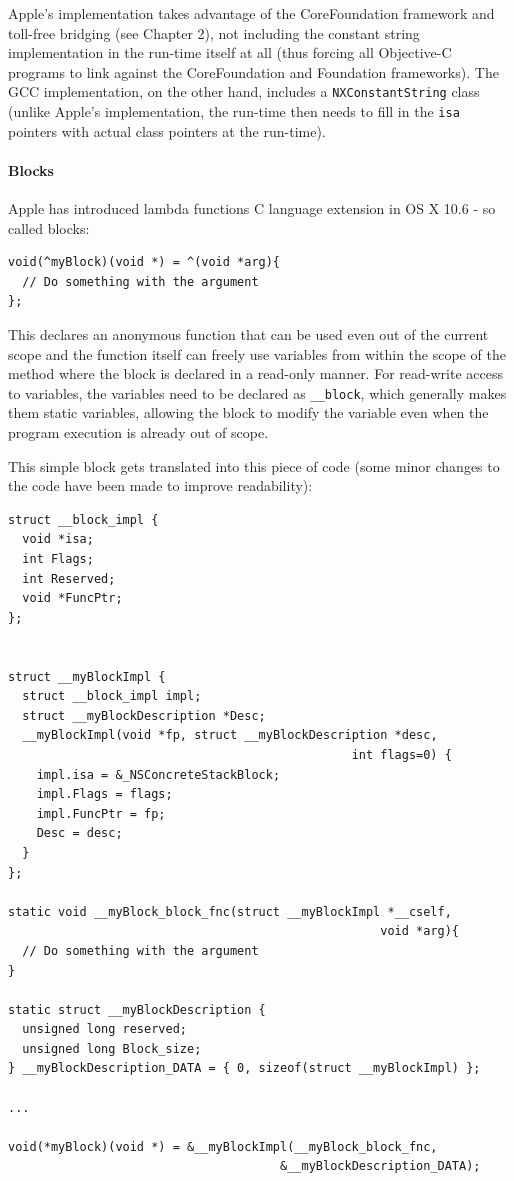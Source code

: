 Apple's implementation takes advantage of the CoreFoundation framework and toll-free bridging (see Chapter 2), not including the constant string implementation in the run-time itself at all (thus forcing all Objective-C programs to link against the CoreFoundation and Foundation frameworks). The GCC implementation, on the other hand, includes a \verb=NXConstantString= class (unlike Apple's implementation, the run-time then needs to fill in the \verb=isa= pointers with actual class pointers at the run-time).

\paragraph{Blocks}

Apple has introduced lambda functions C language extension in OS X 10.6 - so called blocks:

\begin{verbatim}
void(^myBlock)(void *) = ^(void *arg){
  // Do something with the argument
};
\end{verbatim}

This declares an anonymous function that can be used even out of the current scope and the function itself can freely use variables from within the scope of the method where the block is declared in a read-only manner. For read-write access to variables, the variables need to be declared as \verb=__block=, which generally makes them static variables, allowing the block to modify the variable even when the program execution is already out of scope.

This simple block gets translated into this piece of code (some minor changes to the code have been made to improve readability):

\begin{verbatim}
struct __block_impl {
  void *isa;
  int Flags;
  int Reserved;
  void *FuncPtr;
};


struct __myBlockImpl {
  struct __block_impl impl;
  struct __myBlockDescription *Desc;
  __myBlockImpl(void *fp, struct __myBlockDescription *desc, 
                                                int flags=0) {
    impl.isa = &_NSConcreteStackBlock;
    impl.Flags = flags;
    impl.FuncPtr = fp;
    Desc = desc;
  }
};

static void __myBlock_block_fnc(struct __myBlockImpl *__cself, 
                                                    void *arg){
  // Do something with the argument
}

static struct __myBlockDescription {
  unsigned long reserved;
  unsigned long Block_size;
} __myBlockDescription_DATA = { 0, sizeof(struct __myBlockImpl) };

...

void(*myBlock)(void *) = &__myBlockImpl(__myBlock_block_fnc, 
                                      &__myBlockDescription_DATA);

\end{verbatim}

